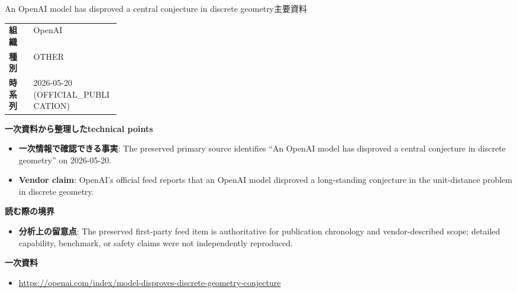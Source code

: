 \begin{technicalnote}{An OpenAI model has disproved a central conjecture in discrete geometry}{主要資料}
\begin{tabularx}{\linewidth}{@{}>{\bfseries}p{0.22\linewidth}X@{}}
組織 & OpenAI \\
種別 & OTHER \\
時系列 & 2026-05-20 (OFFICIAL\_PUBLICATION) \\
\end{tabularx}
\smallskip
{\bfseries 一次資料から整理したtechnical points}
\begin{itemize}[leftmargin=1.5em,itemsep=0.35em]
\item \textbf{一次情報で確認できる事実}: The preserved primary source identifies “An OpenAI model has disproved a central conjecture in discrete geometry” on 2026-05-20.
\item \textbf{Vendor claim}: OpenAI's official feed reports that an OpenAI model disproved a long-standing conjecture in the unit-distance problem in discrete geometry.
\end{itemize}
{\bfseries 読む際の境界}
\begin{itemize}[leftmargin=1.5em,itemsep=0.35em]
\item \textbf{分析上の留意点}: The preserved first-party feed item is authoritative for publication chronology and vendor-described scope; detailed capability, benchmark, or safety claims were not independently reproduced.
\end{itemize}
{\bfseries 一次資料}
\begingroup\sloppy
\begin{itemize}[leftmargin=1.5em,itemsep=0.25em]
\item {\scriptsize\url{https://openai.com/index/model-disproves-discrete-geometry-conjecture}}
\end{itemize}
\endgroup
\end{technicalnote}
\medskip

